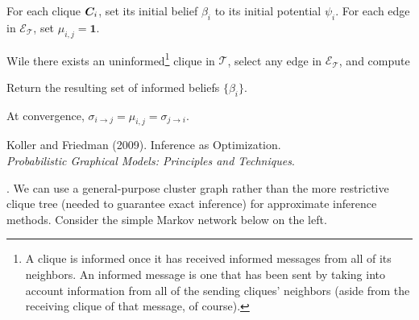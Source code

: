 \documentclass[11pt]{article}
\begin{document}
\begin{compactenum}
	\item For each clique $\matr[i]{C}$, set its initial belief $\beta_i$ to its initial potential $\psi_i$. For each edge in $\mathcal{E}_{\mathcal T}$, set $\mu_{i,j} = \mathbf{1}$.
	
	\item Wile there exists an uninformed\footnote{A clique is informed once it has received informed messages from all of its neighbors. An informed message is one that has been sent by taking into account information from all of the sending cliques' neighbors (aside from the receiving clique of that message, of course).} clique in $\mathcal T$, select any edge in $\mathcal{E}_{\mathcal T}$, and compute
	
	\item Return the resulting set of informed beliefs $\{ \beta_i \}$. 
\end{compactenum}
At convergence, $\sigma_{i \rightarrow j} = \mu_{i,j} = \sigma_{j \rightarrow i}$. 









\vspace{-1.7em}
{\scriptsize Koller and Friedman (2009). Inference as Optimization.\\ \textit{Probabilistic Graphical Models: Principles and Techniques}.\\ }

\p {}. We can use a general-purpose cluster graph rather than the more restrictive clique tree (needed to guarantee exact inference) for approximate inference methods. Consider the simple Markov network below on the left.
\end{document}
